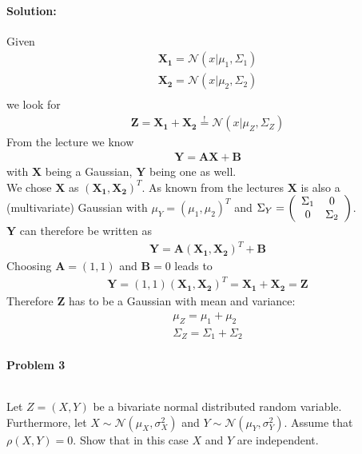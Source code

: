 \documentclass{article}
\renewcommand{\Vec}[1]{\ensuremath{\mathbf{#1}}}
\newcommand{\Mtx}[1]{\ensuremath{\mathbf{#1}}}
\begin{document}
\paragraph*{Solution:}
Given
\begin{eqnarray}
\Vec{X_1} = \mathcal{N}(x | \mu_1, \Sigma_1) \\
\Vec{X_2} = \mathcal{N}(x | \mu_2, \Sigma_2) \\
\end{eqnarray}
we look for 
\begin{eqnarray}
\Vec{Z} = \Vec{X_1} + \Vec{X_2} \overset{!}{=} \mathcal{N}(x | \mu_Z, \Sigma_Z)
\end{eqnarray}
From the lecture we know 
\begin{eqnarray}
\Vec{Y} = \Mtx{A}\Vec{X} + \Mtx{B}
\end{eqnarray}
with $\Mtx{X}$ being a Gaussian, $\Vec{Y}$ being one as well.\\
We chose $\Vec{X}$ as $(\Vec{X_1},\Vec{X_2})^T$. As known from the lectures $\Vec{X}$ is also a (multivariate) Gaussian with $\mu_Y = (\mu_1,\mu_2)^T$ and $\Sigma_Y = \left( \begin{array}{c c} \Sigma_1 & 0 \\ 0 & \Sigma_2 \end{array}\right)$.\\
$\Vec{Y}$ can therefore be written as 
\begin{eqnarray}
\Vec{Y} = \Mtx{A} (\Vec{X_1},\Vec{X_2})^T + \Mtx{B}
\end{eqnarray}
Choosing $\Mtx{A} = (1,1)$ and $\Mtx{B} = 0$ leads to
\begin{eqnarray}
\Vec{Y} = (1,1) (\Vec{X_1},\Vec{X_2})^T = \Vec{X_1} + \Vec{X_2} = \Vec{Z}
\end{eqnarray}
Therefore $\Vec{Z}$ has to be a Gaussian with mean and variance:
\begin{eqnarray}
\mu_Z = \mu_1+\mu_2 \\
\Sigma_Z = \Sigma_1 + \Sigma_2
\end{eqnarray}

\paragraph*{Problem 3}
$\;$ 

Let $Z = (X, Y)$ be a bivariate normal distributed random variable. Furthermore, let $X \sim \mathcal{N}(\mu_X, \sigma^2_X)$ and $Y \sim \mathcal{N}(\mu_Y, \sigma^2_Y)$. Assume that $\rho(X, Y) = 0$. Show that in this case $X$ and $Y$ are independent.
\end{document}
